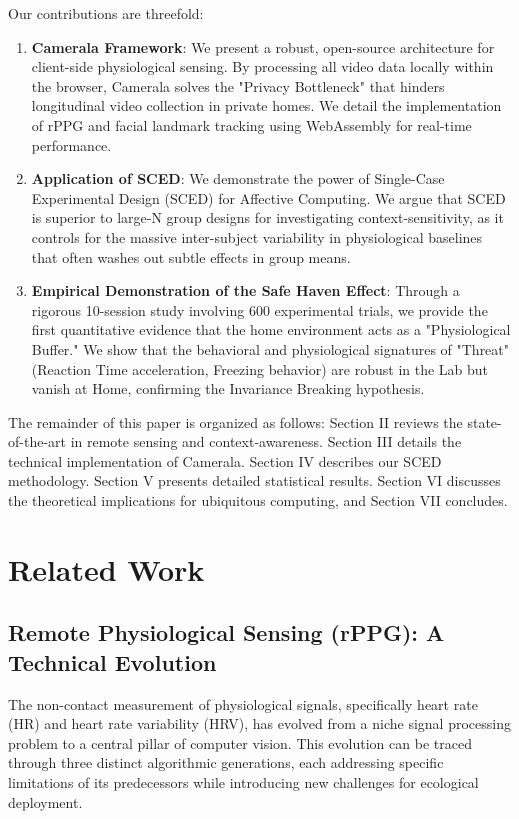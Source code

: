 \documentclass[journal]{IEEEtran}
\begin{document}
Our contributions are threefold:
\begin{enumerate}
    \item \textbf{Camerala Framework}: We present a robust, open-source architecture for client-side physiological sensing. By processing all video data locally within the browser, Camerala solves the "Privacy Bottleneck" that hinders longitudinal video collection in private homes. We detail the implementation of rPPG and facial landmark tracking using WebAssembly for real-time performance.
    
    \item \textbf{Application of SCED}: We demonstrate the power of Single-Case Experimental Design (SCED) \cite{barlow_sced} for Affective Computing. We argue that SCED is superior to large-N group designs for investigating context-sensitivity, as it controls for the massive inter-subject variability in physiological baselines that often washes out subtle effects in group means.
    
    \item \textbf{Empirical Demonstration of the Safe Haven Effect}: Through a rigorous 10-session study involving 600 experimental trials, we provide the first quantitative evidence that the home environment acts as a "Physiological Buffer." We show that the behavioral and physiological signatures of "Threat" (Reaction Time acceleration, Freezing behavior) are robust in the Lab but vanish at Home, confirming the Invariance Breaking hypothesis.
\end{enumerate}

The remainder of this paper is organized as follows: Section II reviews the state-of-the-art in remote sensing and context-awareness. Section III details the technical implementation of Camerala. Section IV describes our SCED methodology. Section V presents detailed statistical results. Section VI discusses the theoretical implications for ubiquitous computing, and Section VII concludes.

\section{Related Work}

\subsection{Remote Physiological Sensing (rPPG): A Technical Evolution}
The non-contact measurement of physiological signals, specifically heart rate (HR) and heart rate variability (HRV), has evolved from a niche signal processing problem to a central pillar of computer vision. This evolution can be traced through three distinct algorithmic generations, each addressing specific limitations of its predecessors while introducing new challenges for ecological deployment.
\end{document}
